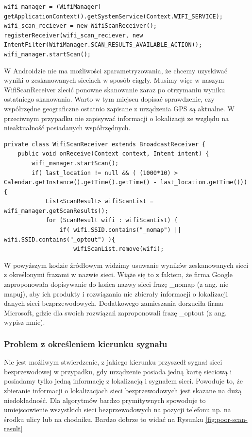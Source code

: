 \begin{verbatim}
wifi_manager = (WifiManager) getApplicationContext().getSystemService(Context.WIFI_SERVICE);
wifi_scan_reciever = new WifiScanReceiver();
registerReceiver(wifi_scan_reciever, new IntentFilter(WifiManager.SCAN_RESULTS_AVAILABLE_ACTION));
wifi_manager.startScan();
\end{verbatim}

W Androidzie nie ma możliwości zparametryzowania, że chcemy uzyskiwać wyniki o zeskanowanych sieciach w sposób ciągły. Musimy więc w naszym WifiScanReceiver zlecić ponowne skanowanie zaraz po otrzymaniu wyniku ostatniego skanowania. Warto w tym miejscu dopisać sprawdzenie, czy współrzędne geograficzne ostatnio zapisane z urządzenia GPS są aktualne. W przeciwnym przypadku nie zapisywać informacji o lokalizacji ze względu na nieaktualność posiadanych współrzędnych.

\begin{verbatim}
private class WifiScanReceiver extends BroadcastReceiver {
    public void onReceive(Context context, Intent intent) {
        wifi_manager.startScan();
        if( last_location != null && ( (1000*10) > Calendar.getInstance().getTime().getTime() - last_location.getTime())){
            List<ScanResult> wifiScanList = wifi_manager.getScanResults();
            for (ScanResult wifi : wifiScanList) {
                if( wifi.SSID.contains("_nomap") || wifi.SSID.contains("_optout") ){
                    wifiScanList.remove(wifi);
\end{verbatim}
W powyższym kodzie źródłowym widzimy usuwanie wyników zeskanowanych sieci z określonymi frazami w nazwie sieci. Wiąże się to z faktem, że firma Google zaproponowała dopisywanie do końca nazwy sieci frazę \_nomap (z ang. nie mapuj), aby ich produkty i rozwiązania nie zbierały informacji o lokalizacji danych sieci bezprzewodowych.\cite{GoogleNomap} Dodatkowego zamieszania dorzuciła firma Microsoft, gdzie dla swoich rozwiązań zaproponowali frazę \_optout (z ang. wypisz mnie).\cite{MicrosoftOptout}

\subsubsection{Problem z określeniem kierunku sygnału}
Nie jest możliwym stwierdzenie, z jakiego kierunku przyszedł sygnał sieci bezprzewodowej w przypadku, gdy urządzenie posiada jedną kartę sieciową i posiadamy tylko jedną informację z lokalizacją i sygnałem sieci. Powoduje to, że zbieranie informacji o lokalizacjach sieci bezprzewodowych jest skazane na dużą niedokładność. Dla algorytmów bardzo prymitywnych spowoduje to umiejscowienie wszystkich sieci bezprzewodowych na pozycji telefonu np. na środku ulicy lub na chodniku. Bardzo dobrze to widać na Rysunku \ref{fig:poor-scan-result}

